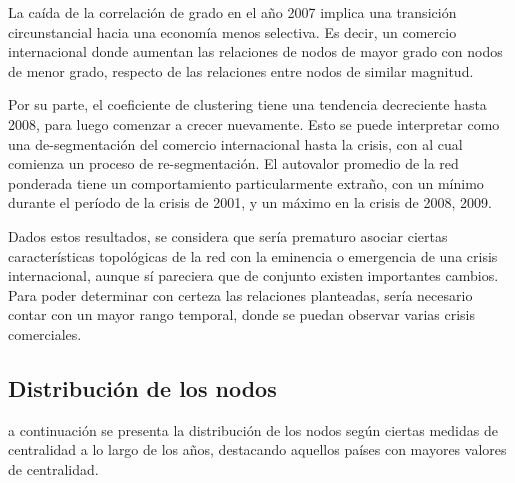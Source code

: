 \documentclass[runningheads,a4paper]{llncs}
\begin{document}
La caída de la correlación de grado en el año 2007 implica una transición circunstancial hacia una economía menos selectiva. Es decir, un comercio internacional donde aumentan las relaciones de nodos de mayor grado con nodos de menor grado, respecto de las relaciones entre nodos de similar magnitud.            

Por su parte, el coeficiente de clustering tiene una tendencia decreciente hasta 2008, para luego comenzar a crecer nuevamente. Esto se puede interpretar como una de-segmentación del comercio internacional hasta la crisis, con al cual comienza un proceso de re-segmentación. 
El autovalor promedio de la red ponderada tiene un comportamiento particularmente extraño, con un mínimo durante el período de la crisis de 2001, y un máximo en la crisis de 2008, 2009. 

Dados estos resultados, se considera que sería prematuro asociar ciertas características topológicas de la red con la eminencia o emergencia de una crisis internacional, aunque sí pareciera que de conjunto existen importantes cambios. Para poder determinar con certeza las relaciones planteadas, sería necesario contar con un mayor rango temporal, donde se puedan observar varias crisis comerciales.

\subsection{Distribución de los nodos}

a continuación se presenta la distribución de los nodos según ciertas medidas de centralidad a lo largo de los años, destacando aquellos países con mayores valores de centralidad. 
\end{document}
